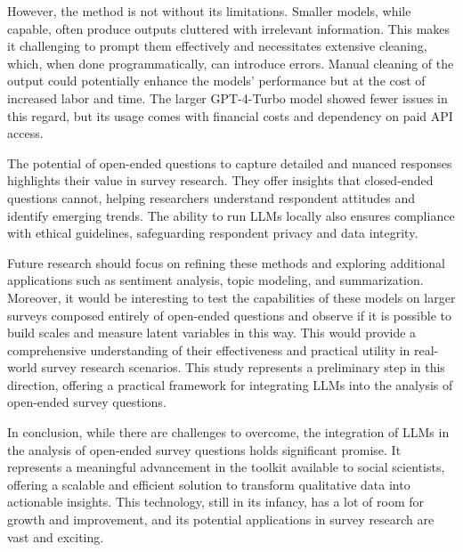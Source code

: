 \documentclass[
  authoryear,
  preprint,
  3p]{elsarticle}
\begin{document}
However, the method is not without its limitations. Smaller models,
while capable, often produce outputs cluttered with irrelevant
information. This makes it challenging to prompt them effectively and
necessitates extensive cleaning, which, when done programmatically, can
introduce errors. Manual cleaning of the output could potentially
enhance the models' performance but at the cost of increased labor and
time. The larger GPT-4-Turbo model showed fewer issues in this regard,
but its usage comes with financial costs and dependency on paid API
access.

The potential of open-ended questions to capture detailed and nuanced
responses highlights their value in survey research. They offer insights
that closed-ended questions cannot, helping researchers understand
respondent attitudes and identify emerging trends. The ability to run
LLMs locally also ensures compliance with ethical guidelines,
safeguarding respondent privacy and data integrity.

Future research should focus on refining these methods and exploring
additional applications such as sentiment analysis, topic modeling, and
summarization. Moreover, it would be interesting to test the
capabilities of these models on larger surveys composed entirely of
open-ended questions and observe if it is possible to build scales and
measure latent variables in this way. This would provide a comprehensive
understanding of their effectiveness and practical utility in real-world
survey research scenarios. This study represents a preliminary step in
this direction, offering a practical framework for integrating LLMs into
the analysis of open-ended survey questions.

In conclusion, while there are challenges to overcome, the integration
of LLMs in the analysis of open-ended survey questions holds significant
promise. It represents a meaningful advancement in the toolkit available
to social scientists, offering a scalable and efficient solution to
transform qualitative data into actionable insights. This technology,
still in its infancy, has a lot of room for growth and improvement, and
its potential applications in survey research are vast and exciting.

\newpage{}


\renewcommand\refname{References}
  
\end{document}
